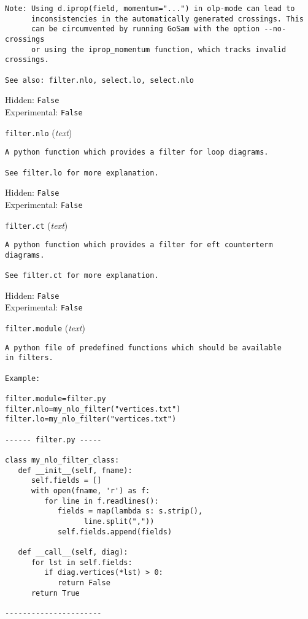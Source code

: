 \begin{basedescript}{\desclabelstyle{\pushlabel}}
\begin{verbatim}
Note: Using d.iprop(field, momentum="...") in olp-mode can lead to
      inconsistencies in the automatically generated crossings. This
      can be circumvented by running GoSam with the option --no-crossings
      or using the iprop_momentum function, which tracks invalid crossings.

See also: filter.nlo, select.lo, select.nlo
\end{verbatim}
Hidden: \verb|False|
\\Experimental: \verb|False|
\\\item[\colorbox{gray!30}{\texttt{filter.nlo}}] (\textit{text})
\begin{verbatim}
A python function which provides a filter for loop diagrams.

See filter.lo for more explanation.
\end{verbatim}
Hidden: \verb|False|
\\Experimental: \verb|False|
\\\item[\colorbox{gray!30}{\texttt{filter.ct}}] (\textit{text})
\begin{verbatim}
A python function which provides a filter for eft counterterm diagrams.

See filter.ct for more explanation.
\end{verbatim}
Hidden: \verb|False|
\\Experimental: \verb|False|
\\\item[\colorbox{gray!30}{\texttt{filter.module}}] (\textit{text})
\begin{verbatim}
A python file of predefined functions which should be available
in filters.

Example:

filter.module=filter.py
filter.nlo=my_nlo_filter("vertices.txt")
filter.lo=my_nlo_filter("vertices.txt")

------ filter.py -----

class my_nlo_filter_class:
   def __init__(self, fname):
      self.fields = []
      with open(fname, 'r') as f:
         for line in f.readlines():
            fields = map(lambda s: s.strip(),
                  line.split(","))
            self.fields.append(fields)

   def __call__(self, diag):
      for lst in self.fields:
         if diag.vertices(*lst) > 0:
            return False
      return True

----------------------


\end{verbatim}
\end{basedescript}
